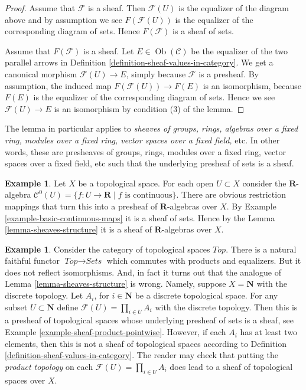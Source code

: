 \documentclass{stacks-project}
\theoremstyle{plain}
\theoremstyle{definition}
\newtheorem{example}[subsection]{Example}
\theoremstyle{remark}
\numberwithin{equation}{subsection}
\def\Ob{\mathop{\mathrm{Ob}}\nolimits}
\begin{document}
\begin{proof}
Assume that $\mathcal{F}$ is a sheaf. Then
$\mathcal{F}(U)$ is the equalizer of the diagram
above and by assumption we see $F(\mathcal{F}(U))$
is the equalizer of the corresponding diagram
of sets. Hence $F(\mathcal{F})$ is a sheaf of sets.

\medskip\noindent
Assume that $F(\mathcal{F})$ is a sheaf.
Let $E \in \Ob(\mathcal{C})$ be the
equalizer of the two parallel arrows in
Definition \ref{definition-sheaf-values-in-category}.
We get a canonical morphism $\mathcal{F}(U) \to E$,
simply because $\mathcal{F}$ is a presheaf.
By assumption, the induced map $F(\mathcal{F}(U)) \to F(E)$
is an isomorphism, because $F(E)$ is the equalizer
of the corresponding diagram of sets. Hence we
see $\mathcal{F}(U) \to E$ is an isomorphism
by condition (3) of the lemma.
\end{proof}

\noindent
The lemma in particular applies to
{\it sheaves of groups, rings, algebras over a fixed ring, modules
over a fixed ring, vector spaces over a fixed field, } etc.
In other words, these are presheaves of groups, rings,
modules over a fixed ring, vector spaces over a fixed field, etc
such that the underlying presheaf of sets is a sheaf.

\begin{example}
\label{example-C0-sheaf-rings}
Let $X$ be a topological space. For each open $U \subset X$ consider
the $\mathbf{R}$-algebra
$\mathcal{C}^{0}(U) = \{ f : U \to \mathbf{R} \mid f\text{ is continuous}\}$.
There are obvious restriction mappings that turn this into a
presheaf of $\mathbf{R}$-algebras over $X$.
By Example \ref{example-basic-continuous-maps} it is a sheaf of sets.
Hence by the Lemma \ref{lemma-sheaves-structure} it is a sheaf of
$\mathbf{R}$-algebras over $X$.
\end{example}

\begin{example}
\label{example-sheaves-topological-spaces}
Consider the category of topological spaces $\textit{Top}$.
There is a natural faithful functor $\textit{Top} \to \textit{Sets}$
which commutes with products and equalizers. But it does
not reflect isomorphisms. And, in fact it turns out that
the analogue of Lemma \ref{lemma-sheaves-structure} is wrong.
Namely, suppose $X = \mathbf{N}$ with the discrete
topology. Let $A_i$, for $i \in \mathbf{N}$ be a discrete
topological space. For any subset $U \subset \mathbf{N}$
define $\mathcal{F}(U) = \prod_{i\in U} A_i$ with the
discrete topology. Then this is a presheaf of topological
spaces whose underlying presheaf of sets is a sheaf, see
Example \ref{example-sheaf-product-pointwise}.
However, if each $A_i$ has at least two elements, then
this is not a sheaf of topological spaces
according to Definition \ref{definition-sheaf-values-in-category}.
The reader may check that putting the {\it product topology} on
each $\mathcal{F}(U) = \prod_{i\in U} A_i$ does lead to a sheaf
of topological spaces over $X$.
\end{example}
\end{document}
